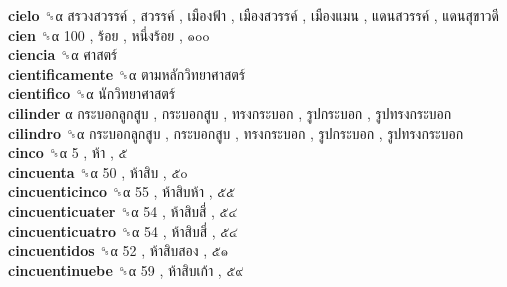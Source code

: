 \textbf{cielo} ␝α   สรวงสวรรค์ ,  สวรรค์ ,  เมืองฟ้า ,  เมืองสวรรค์ ,  เมืองแมน ,  แดนสวรรค์ ,  แดนสุขาวดี   \\
\textbf{cien} ␝α   100 ,  ร้อย ,  หนึ่งร้อย ,  ๑๐๐   \\
\textbf{ciencia} ␝α   ศาสตร์   \\
\textbf{cientificamente} ␝α   ตามหลักวิทยาศาสตร์   \\
\textbf{cientifico} ␝α   นักวิทยาศาสตร์   \\
\textbf{cilinder} α   กระบอกลูกสูบ ,  กระบอกสูบ ,  ทรงกระบอก ,  รูปกระบอก ,  รูปทรงกระบอก   \\
\textbf{cilindro} ␝α   กระบอกลูกสูบ ,  กระบอกสูบ ,  ทรงกระบอก ,  รูปกระบอก ,  รูปทรงกระบอก   \\
\textbf{cinco} ␝α   5 ,  ห้า ,  ๕   \\
\textbf{cincuenta} ␝α   50 ,  ห้าสิบ ,  ๕๐   \\
\textbf{cincuenticinco} ␝α   55 ,  ห้าสิบห้า ,  ๕๕   \\
\textbf{cincuenticuater} ␝α   54 ,  ห้าสิบสี่ ,  ๕๔   \\
\textbf{cincuenticuatro} ␝α   54 ,  ห้าสิบสี่ ,  ๕๔   \\
\textbf{cincuentidos} ␝α   52 ,  ห้าสิบสอง ,  ๕๑   \\
\textbf{cincuentinuebe} ␝α   59 ,  ห้าสิบเก้า ,  ๕๙   \\

